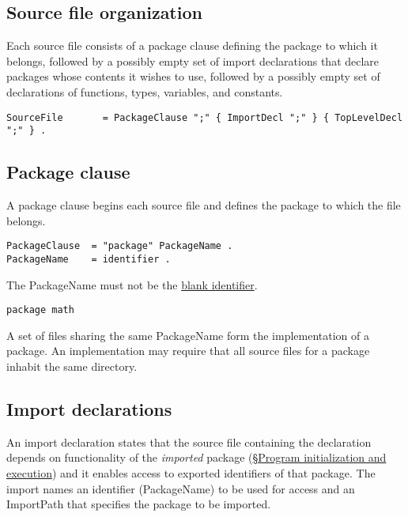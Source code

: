{\subsection*{Source file organization}

Each source file consists of a package clause defining the package to
which it belongs, followed by a possibly empty set of import
declarations that declare packages whose contents it wishes to use,
followed by a possibly empty set of declarations of functions, types,
variables, and constants.

\begin{Verbatim}[frame=single]
SourceFile       = PackageClause ";" { ImportDecl ";" } { TopLevelDecl ";" } .
\end{Verbatim}

\subsection*{Package clause}

A package clause begins each source file and defines the package to
which the file belongs.

\begin{Verbatim}[frame=single]
PackageClause  = "package" PackageName .
PackageName    = identifier .
\end{Verbatim}

The PackageName must not be the \hyperref[Blank\_identifier]{blank
identifier}.

\begin{Verbatim}[frame=single]
package math
\end{Verbatim}

A set of files sharing the same PackageName form the implementation of a
package. An implementation may require that all source files for a
package inhabit the same directory.

\subsection*{Import declarations}

An import declaration states that the source file containing the
declaration depends on functionality of the \emph{imported} package
(\hyperref[Program\_initialization\_and\_execution]{§Program
initialization and execution}) and it enables access to
exported identifiers of that package.
The import names an identifier (PackageName) to be used for access and
an ImportPath that specifies the package to be imported.

}
